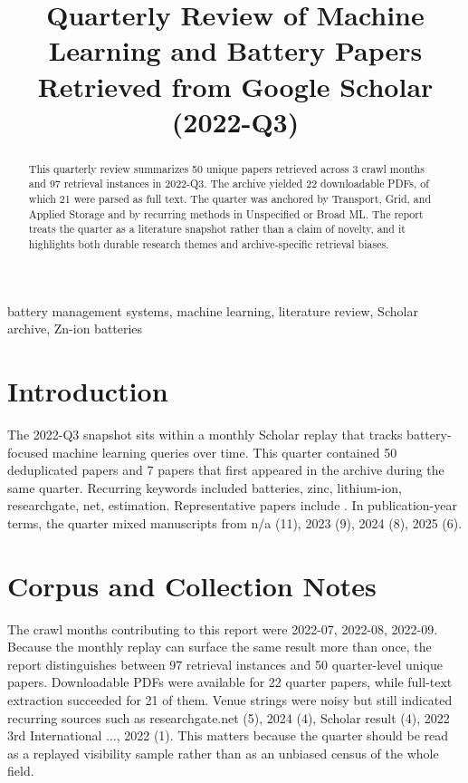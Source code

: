 \documentclass[conference]{IEEEtran}
\begin{document}
\title{ Quarterly Review of Machine Learning and Battery Papers Retrieved from Google Scholar (2022-Q3) }

\author{
}

\maketitle

\begin{abstract}
This quarterly review summarizes 50 unique papers retrieved across 3 crawl months and 97 retrieval instances in 2022-Q3. The archive yielded 22 downloadable PDFs, of which 21 were parsed as full text. The quarter was anchored by Transport, Grid, and Applied Storage and by recurring methods in Unspecified or Broad ML. The report treats the quarter as a literature snapshot rather than a claim of novelty, and it highlights both durable research themes and archive-specific retrieval biases.
\end{abstract}

\begin{IEEEkeywords}
battery management systems, machine learning, literature review, Scholar archive, Zn-ion batteries
\end{IEEEkeywords}

\section{Introduction}
The 2022-Q3 snapshot sits within a monthly Scholar replay that tracks battery-focused machine learning queries over time. This quarter contained 50 deduplicated papers and 7 papers that first appeared in the archive during the same quarter. Recurring keywords included batteries, zinc, lithium-ion, researchgate, net, estimation. Representative papers include \cite{machinelearningdriven2025,socestimationof2023,recentadvancesin2025,aphysicsinspired2023}. In publication-year terms, the quarter mixed manuscripts from n/a (11), 2023 (9), 2024 (8), 2025 (6).

\section{Corpus and Collection Notes}
The crawl months contributing to this report were 2022-07, 2022-08, 2022-09. Because the monthly replay can surface the same result more than once, the report distinguishes between 97 retrieval instances and 50 quarter-level unique papers. Downloadable PDFs were available for 22 quarter papers, while full-text extraction succeeded for 21 of them. Venue strings were noisy but still indicated recurring sources such as researchgate.net (5), 2024 (4), Scholar result (4), 2022 3rd International ..., 2022 (1). This matters because the quarter should be read as a replayed visibility sample rather than as an unbiased census of the whole field.
\end{document}
